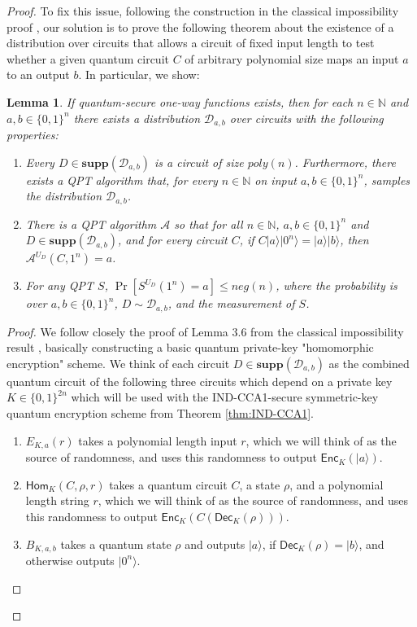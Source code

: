 \documentclass[11pt]{article}
\numberwithin{equation}{section}
\newtheorem{lemma}[theorem]{Lemma}
\newcommand{\algo}{\mathcal}
\newcommand{\Enc}{\ensuremath{\mathsf{Enc}}\xspace}
\newcommand{\Dec}{\ensuremath{\mathsf{Dec}}\xspace}
\newcommand{\Homorcl}{\ensuremath{\mathsf{Hom}}\xspace}
\newcommand\supp{\textbf{supp}}
\begin{document}
{\begin{proof}
To fix this issue, following the construction in the classical impossibility proof \cite{BGIRSVY12}, our solution is to prove the following theorem about the existence of a distribution over circuits that allows a circuit of fixed input length to test whether a given quantum circuit $C$ of arbitrary polynomial size maps an input $a$ to an output $b$. In particular, we show:
\begin{lemma}\label{lemma-circuitdistribution}
	If quantum-secure one-way functions exists, then for each $n\in\mathbb{N}$ and $a,b\in\{0,1\}^n$ there exists a distribution $\mathcal{D}_{a,b}$ over circuits with the following properties:
\begin{enumerate}
\item{Every $D\in \supp(\mathcal{D}_{a,b})$ is a circuit of size $poly(n)$.  Furthermore, there exists a QPT algorithm that,  for every $n\in\mathbb{N}$ on input $a,b\in\{0,1\}^n$, samples the distribution $\mathcal{D}_{a,b}$.}
\item{There is a QPT algorithm $\algo{A}$ so that for all $n \in \mathbb{N}$,   $a,b\in\{0,1\}^n$ and $D\in \supp(\mathcal{D}_{a,b})$, and for every circuit $C$, if $C|a\rangle|0^n\rangle=|a\rangle|b\rangle$, then $\algo{A}^{U_D}(C,1^n)=a$.}
\item{For any QPT $S$, $\Pr[S^{U_D}(1^n)=a]\leq neg(n)$, where the probability is over $a,b\in\{0,1\}^n$, $D\sim \mathcal{D}_{a,b}$, and the measurement of $S$.}	
\end{enumerate}
\end{lemma}

\begin{proof}  We follow closely the proof of Lemma 3.6 from the classical impossibility result \cite{BGIRSVY12}, basically constructing a basic quantum private-key "homomorphic encryption" scheme.  We think of each circuit $D\in \supp(\mathcal{D}_{a,b})$ as the combined quantum circuit of the following three circuits which depend on a private key $K\in\{0,1\}^{2n}$ which will be used with the IND-CCA1-secure symmetric-key quantum encryption scheme from Theorem \ref{thm:IND-CCA1}.
\begin{enumerate}
\item{$E_{K,a}(r)$ takes a polynomial length input $r$, which we will think of as the source of randomness, and uses this randomness to output  $\Enc_{K}(|a\rangle)$}.  
\item{$\Homorcl_K(C,\rho,r)$ takes a quantum circuit $C$, a state $\rho$, and a polynomial length string $r$, which we will think of as the source of randomness, and uses this randomness to output $\Enc_K(C(\Dec_K(\rho)))$}.
\item{$B_{K,a,b}$ takes a quantum state $\rho$ and outputs $|a\rangle$, if $\Dec_{K}(\rho)=|b\rangle$, and otherwise outputs $|0^n\rangle$.}	
\end{enumerate}


\end{proof}
\end{proof}}
\end{document}
